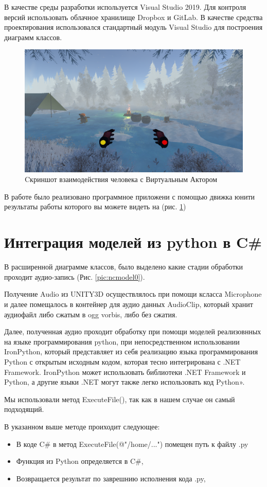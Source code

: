 В качестве среды разработки используется Visual Studio 2019. Для контроля версий использовать облачное хранилище Dropbox и GitLab. 
В качестве средства проектирования использовался стандартный модуль Visual Studio для построения диаграмм классов.

\begin{figure}[h]
\includegraphics[width=0.75\columnwidth]{./img/penis.png}
\centering
\caption{Cкриншот взаимодействия человека с Виртуальным Актором}
\label{pic:penis}
\end{figure}

В работе было реализовано программное приложени с помощью движка юнити результаты работы которого вы можете видеть на (рис. \ref{pic:penis})

\section{Интеграция моделей из python в C\#}

В расширенной диаграмме классов, было выделено какие стадии обработки проходит аудио-запись (Рис. \ref{pic:ncmodel0}).

Получение Audio из UNITY3D осуществлялось при помощи ксласса Microphone и далее помещалось 
в контейнер для аудио данных AudioClip, который хранит аудиофайл либо сжатым в ogg vorbis, либо без сжатия.

Далее, полученная аудио проходит обработку при помощи моделей реализовнных на языке программирования python, 
при непосредственном использовании IronPython, который представляет из себя реализацию языка программирования 
Python с открытым исходным кодом, которая тесно интегрирована с .NET Framework. 
IronPython может использовать библиотеки .NET Framework и Python, а другие языки .NET могут также легко использовать код Python».

Мы использовали метод ExecuteFile(), так как в нашем случае он самый подходящий.

В указанном выше методе проиходит следующее:
\begin{itemize}
  \item В коде C\# в метод ExecuteFile(@"/home/...") помещен путь к файлу .py
  \item Функция из Python определяется в C\#,
  \item Возвращается результат по заврешнию исполнения кода .py,
\end{itemize}

